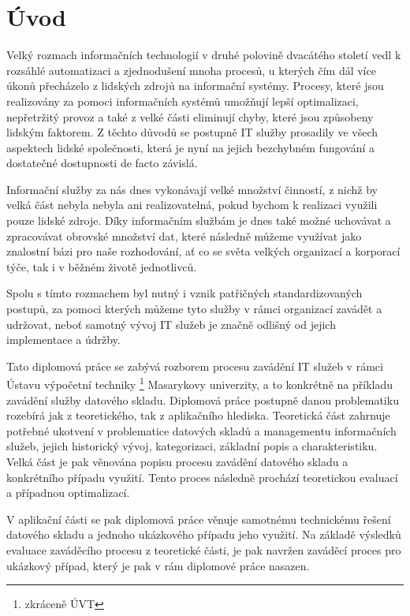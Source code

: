 \documentclass[
  digital,     %
  twoside,     %
  lof,         %
  lot,         %
]{fithesis4}
\begin{document}
\chapter{Úvod}
Velký rozmach informačních technologií v druhé polovině dvacátého století vedl k rozsáhlé automatizaci a zjednodušení mnoha procesů, u kterých čím dál více úkonů přecházelo z lidských zdrojů na informační systémy. Procesy, které jsou realizovány za pomoci informačních systémů umožňují lepší optimalizaci, nepřetržitý provoz a také z velké části eliminují chyby, které jsou způsobeny lidským faktorem. Z těchto důvodů se postupně IT služby prosadily ve všech aspektech lidské společnosti, která je nyní na jejich bezchybném fungování a dostatečné dostupnosti de facto závislá. 

Informační služby za nás dnes vykonávají velké množství činností, z nichž by velká část nebyla nebyla ani realizovatelná, pokud bychom k realizaci využili pouze lidské zdroje. Díky informačním službám je dnes také možné uchovávat a zpracovávat obrovské množství dat, které následně můžeme využívat jako znalostní bázi pro naše rozhodování, ať co se světa velkých organizací a korporací týče, tak i v běžném životě jednotlivců.

Spolu s tímto rozmachem byl nutný i vznik patřičných standardizovaných postupů, za pomoci kterých můžeme tyto služby v rámci organizací zavádět a udržovat, neboť samotný vývoj IT služeb je značně odlišný od jejich implementace a údržby. 

Tato diplomová práce se zabývá rozborem procesu zavádění IT služeb v rámci Ústavu výpočetní techniky \footnote{zkráceně ÚVT} Masarykovy univerzity, a to konkrétně na příkladu zavádění služby datového skladu. Diplomová práce postupně danou problematiku rozebírá jak z teoretického, tak z aplikačního hlediska. Teoretická část zahrnuje potřebné ukotvení v problematice datových skladů a managementu informačních služeb, jejich historický vývoj, kategorizaci, základní popis a charakteristiku. Velká část je pak věnována popisu procesu zavádění datového skladu a konkrétního případu využití. Tento proces následně prochází teoretickou evaluací a případnou optimalizací. 

V aplikační části se pak diplomová práce věnuje samotnému technickému řešení datového skladu a jednoho ukázkového případu jeho využití. Na základě výsledků evaluace zaváděcího procesu z teoretické části, je pak navržen zaváděcí proces pro ukázkový případ, který je pak v rám diplomové práce nasazen. 
\end{document}
